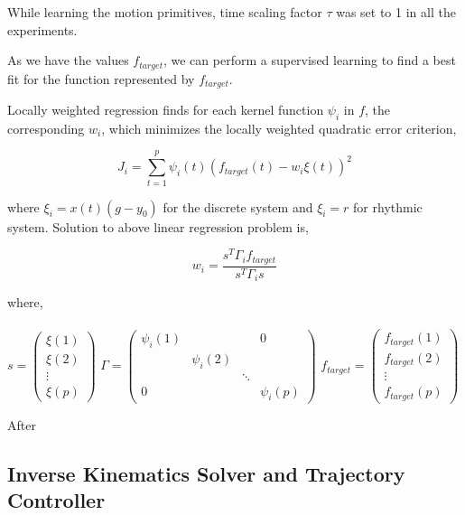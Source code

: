 While learning the motion primitives, time scaling factor $\tau$ was set to 1 in all the experiments. 

As we have the values $f_{target}$, we can perform a supervised learning to find a best fit for the function represented by $f_{target}$. 

Locally weighted regression finds for each kernel function $\psi_{i}$ in $f$, the
corresponding $w_{i}$, which minimizes the locally weighted quadratic error criterion,

\begin{equation}
	J_{i} = \sum_{t=1}^{p}\psi_{i}(t)(f_{target}(t)-w_{i}\xi(t))^{2}
\end{equation}

where $\xi_{i} = x(t)(g-y_{0})$ for the discrete system and $\xi_{i} = r$ for rhythmic system. Solution to above linear regression problem is,

\begin{equation}
	w_{i} = \frac{s^{T}\Gamma_{i}f_{target}}{s^{T}\Gamma_{i}s}
\end{equation}

where,\\
\\
\vspace{1cm}
$
s = 
\begin{pmatrix}
\xi(1) \\
\xi(2) \\
\vdots  \\
\xi(p) 
\end{pmatrix}
$
$
\Gamma = 
\begin{pmatrix}
	\psi_{i}(1) &   &  & 0 \\
	 &\psi_{i}(2)&  &  \\
	 &  & \ddots &   \\
	0 &  &  & \psi_{i}(p)
\end{pmatrix}
$
$
f_{target} = 
\begin{pmatrix}
f_{target}(1) \\
f_{target}(2) \\
\vdots  \\
f_{target}(p) 
\end{pmatrix}
$


 

After 

 




\subsection{Inverse Kinematics Solver and Trajectory Controller}

